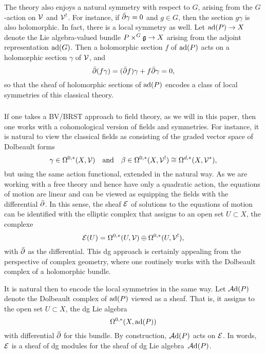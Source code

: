 The theory also enjoys a natural symmetry with respect to $G$,
arising from the $G$-action on $\mathcal V$ and $\mathcal V^!$.
For instance, if $\Bar{\partial} \gamma = 0$ and $g \in G$, then the section $g \gamma$ is also holomorphic.
In fact, there is a local symmetry as well.
Let ${\rm ad}(P) \to X$ denote the Lie algebra-valued bundle $P \times^G \mathfrak g \to X$ arising from the adjoint representation ${\rm ad}(G)$.
Then a holomorphic section $f$ of ${\rm ad}(P)$ acts on a holomorphic section $\gamma$ of $\mathcal V$,
and 
\[
\Bar{\partial}(f \gamma) =  (\Bar{\partial} f) \gamma + f \Bar{\partial} \gamma = 0,
\]
so that the sheaf of holomorphic sections of ${\rm ad}(P)$ encodes a class of local symmetries of this classical theory.

\subsubsection{}

If one takes a BV/BRST approach to field theory, as we will in this paper,
then one works with a cohomological version of fields and symmetries.
For instance, it is natural to view the classical fields as consisting of the graded vector space of Dolbeault forms
\[
\gamma \in \Omega^{0,*}(X,\mathcal V) \quad \text{and} \quad \beta \in \Omega^{0,*}(X, \mathcal V^!) \cong \Omega^{d,*}(X, \mathcal V^*),
\]
but using the same action functional, extended in the natural way.
As we are working with a free theory and hence have only a quadratic action,
the equations of motion are linear and can be viewed as equipping the fields with the differential $\Bar{\partial}$.
In this sense, the sheaf $\mathcal E$ of solutions to the equations of motion can be identified with the elliptic complex that assigns to an open set $U \subset X$, the complexe
\[
\mathcal E(U) = \Omega^{0,*}(U,\mathcal V) \oplus \Omega^{0,*}(U, \mathcal V^!),
\]
with $\Bar{\partial}$ as the differential.
This dg approach is certainly appealing from the perspective of complex geometry,
where one routinely works with the Dolbeault complex of a holomorphic bundle.

It is natural then to encode the local symmetries in the same way.
Let $\mathcal A{\rm d}(P)$ denote the Dolbeault complex of ${\rm ad}(P)$ viewed as a sheaf.
That is, it assigns to the open set $U \subset X$, the dg Lie algebra 
\[
\Omega^{0,*}(X,{\rm ad}(P))
\]
with differential $\Bar{\partial}$ for this bundle.
By construction, $\mathcal A{\rm d}(P)$ acts on $\mathcal E$.
In words, $\mathcal E$ is a sheaf of dg modules for the sheaf of dg Lie algebra~$\mathcal A{\rm d}(P)$.

\subsubsection{}

